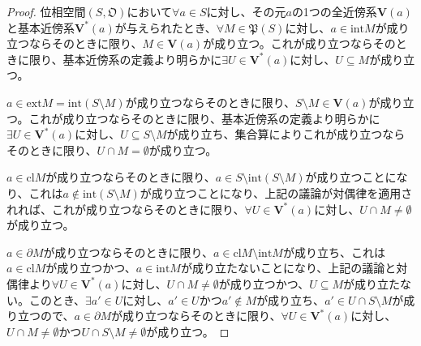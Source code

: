 \documentclass[dvipdfmx]{jsarticle}
\begin{document}
\begin{proof}
位相空間$\left( S,\mathfrak{O} \right)$において$\forall a \in S$に対し、その元$a$の1つの全近傍系$\mathbf{V}(a)$と基本近傍系$\mathbf{V}^{*}(a)$が与えられたとき、$\forall M \in \mathfrak{P}(S)$に対し、$a \in {\mathrm{int}}M$が成り立つならそのときに限り、$M \in \mathbf{V}(a)$が成り立つ。これが成り立つならそのときに限り、基本近傍系の定義より明らかに$\exists U \in \mathbf{V}^{*}(a)$に対し、$U \subseteq M$が成り立つ。\par
$a \in {\mathrm{ext}}M = {\mathrm{int}}(S \setminus M)$が成り立つならそのときに限り、$S \setminus M \in \mathbf{V}(a)$が成り立つ。これが成り立つならそのときに限り、基本近傍系の定義より明らかに$\exists U \in \mathbf{V}^{*}(a)$に対し、$U \subseteq S \setminus M$が成り立ち、集合算によりこれが成り立つならそのときに限り、$U \cap M = \emptyset$が成り立つ。\par
$a \in {\mathrm{cl}}M$が成り立つならそのときに限り、$a \in S \setminus {\mathrm{int}}(S \setminus M)$が成り立つことになり、これは$a \notin {\mathrm{int}}(S \setminus M)$が成り立つことになり、上記の議論が対偶律を適用されれば、これが成り立つならそのときに限り、$\forall U \in \mathbf{V}^{*}(a)$に対し、$U \cap M \neq \emptyset$が成り立つ。\par
$a \in \partial M$が成り立つならそのときに限り、$a \in {\mathrm{cl}}M \setminus {\mathrm{int}}M$が成り立ち、これは$a \in {\mathrm{cl}}M$が成り立つかつ、$a \in {\mathrm{int}}M$が成り立たないことになり、上記の議論と対偶律より$\forall U \in \mathbf{V}^{*}(a)$に対し、$U \cap M \neq \emptyset$が成り立つかつ、$U \subseteq M$が成り立たない。このとき、$\exists a' \in U$に対し、$a' \in U$かつ$a' \notin M$が成り立ち、$a' \in U \cap S \setminus M$が成り立つので、$a \in \partial M$が成り立つならそのときに限り、$\forall U \in \mathbf{V}^{*}(a)$に対し、$U \cap M \neq \emptyset$かつ$U \cap S \setminus M \neq \emptyset$が成り立つ。
\end{proof}
\end{document}
